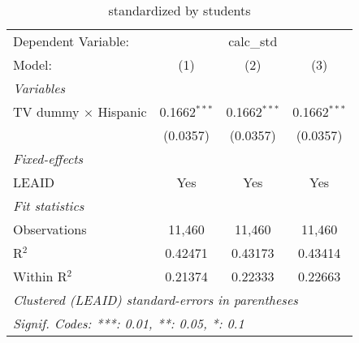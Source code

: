 \begin{table}[htbp]
\centering
\caption{ standardized by students}
\begin{tabular}{lccc}
\tabularnewline\midrule\midrule
Dependent Variable:&\multicolumn{3}{c}{calc\_std}\\
Model:&(1) & (2) & (3)\\
\midrule \emph{Variables}&   &   &  \\
TV dummy $\times$ Hispanic & 0.1662$^{***}$ & 0.1662$^{***}$ & 0.1662$^{***}$\\
  &(0.0357) & (0.0357) & (0.0357)\\
\midrule \emph{Fixed-effects}&   &   &  \\
LEAID & Yes & Yes & Yes\\
\midrule \emph{Fit statistics}&  & & \\
Observations & 11,460&11,460&11,460\\
R$^2$ & 0.42471&0.43173&0.43414\\
Within R$^2$ & 0.21374&0.22333&0.22663\\
\midrule\midrule\multicolumn{4}{l}{\emph{Clustered (LEAID) standard-errors in parentheses}}\\
\multicolumn{4}{l}{\emph{Signif. Codes: ***: 0.01, **: 0.05, *: 0.1}}\\
\end{tabular}
\end{table}

